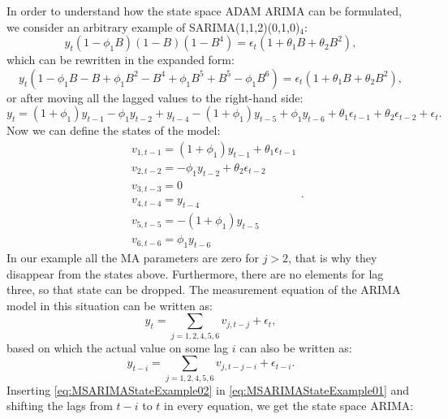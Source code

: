 \documentclass[]{book}
\theoremstyle{definition}
\theoremstyle{definition}
\theoremstyle{definition}
\theoremstyle{definition}
\theoremstyle{remark}
\begin{document}
In order to understand how the state space ADAM ARIMA can be formulated, we consider an arbitrary example of SARIMA(1,1,2)(0,1,0)\(_4\):
\begin{equation*}
    {y}_{t} (1- \phi_1 B)(1-B)(1-B^4) = \epsilon_t (1 + \theta_1 B + \theta_2 B^2),
\end{equation*}
which can be rewritten in the expanded form:
\begin{equation*}
    {y}_{t} (1-\phi_1 B -B + \phi_1 B^2 -B^4 +\phi_1 B^5 + B^5 -\phi_1 B^6) = \epsilon_t (1 + \theta_1 B + \theta_2 B^2),
\end{equation*}
or after moving all the lagged values to the right-hand side:
\begin{equation*}
    {y}_{t} = (1+\phi_1) {y}_{t-1} -\phi_1 {y}_{t-2} + {y}_{t-4} -(1+\phi_1) {y}_{t-5} + \phi_1 {y}_{t-6} + \theta_1 \epsilon_{t-1} + \theta_2 \epsilon_{t-2} + \epsilon_t .
\end{equation*}
Now we can define the states of the model:
\begin{equation}
    \begin{aligned}
    & v_{1,t-1} = (1+\phi_1) y_{t-1} + \theta_1 \epsilon_{t-1} \\
    & v_{2,t-2} = -\phi_1 y_{t-2} + \theta_2 \epsilon_{t-2} \\
    & v_{3,t-3} = 0 \\
    & v_{4,t-4} = y_{t-4} \\
    & v_{5,t-5} = -(1+\phi_1) y_{t-5} \\
    & v_{6,t-6} = \phi_1 y_{t-6}
    \end{aligned} .
  \label{eq:MSARIMAStateExample01}
\end{equation}
In our example all the MA parameters are zero for \(j>2\), that is why they disappear from the states above. Furthermore, there are no elements for lag three, so that state can be dropped. The measurement equation of the ARIMA model in this situation can be written as:
\begin{equation*}
    {y}_{t} = \sum_{j=1,2,4,5,6} v_{j,t-j} + \epsilon_t ,
\end{equation*}
based on which the actual value on some lag \(i\) can also be written as:
\begin{equation}
    {y}_{t-i} = \sum_{j=1,2,4,5,6} v_{j,t-j-i} + \epsilon_{t-i}.
  \label{eq:MSARIMAStateExample02}
\end{equation}
Inserting \eqref{eq:MSARIMAStateExample02} in \eqref{eq:MSARIMAStateExample01} and shifting the lags from \(t-i\) to \(t\) in every equation, we get the state space ARIMA:
\end{document}
